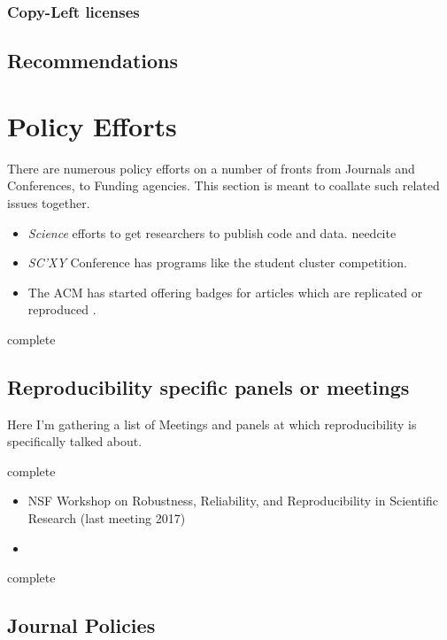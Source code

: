 \documentclass[american]{article}
\newcommand{\complete}{
	\gls{complete}
}
\newcommand{\needcite}{
	\gls{needcite}
}
\begin{document}
\subsubsection{Copy-Left licenses} \label{sec:legal-licensing-left}

\subsection{Recommendations} \label{sec:legal-recommendations}

\section{Policy Efforts} \label{sec:policy}

There are numerous policy efforts on a number of fronts from Journals and Conferences, to Funding agencies. This section is meant to coallate such related issues together.

\begin{itemize}
\item \textit{Science} efforts to get researchers to publish code and data. \needcite
\item \textit{SC'XY} Conference has programs like the student cluster competition. \cite{sighpc-connect-repro-1,sighpc-connect-repro-2}
\item The ACM has started offering badges for articles which are replicated or reproduced \cite{acm-badging-announcement}.
\end{itemize}

\complete

\subsection{Reproducibility specific panels or meetings} \label{sec:policy-panels}

Here I'm gathering a list of Meetings and panels at which reproducibility is specifically talked about.

\complete

\begin{itemize}
\item NSF Workshop on Robustness, Reliability, and Reproducibility in Scientific Research (last meeting 2017)
\item 
\end{itemize}

\complete

\subsection{Journal Policies} \label{sec:policy-journals}
\end{document}
